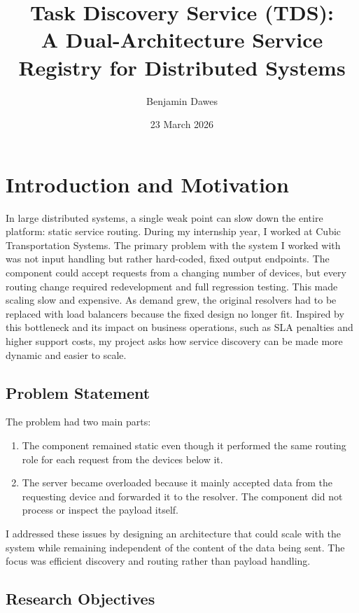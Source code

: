 \documentclass[10pt,a4paper]{article}
\title{\textbf{Task Discovery Service (TDS): \\
A Dual-Architecture Service Registry for Distributed Systems}}
\author{Benjamin Dawes}
\date{23 March 2026}
\begin{document}
\maketitle
\thispagestyle{empty}

\section{Introduction and Motivation}

In large distributed systems, a single weak point can slow down the entire platform: static service routing. During my internship year, I worked at Cubic Transportation Systems. The primary problem with the system I worked with was not input handling but rather hard-coded, fixed output endpoints. The component could accept requests from a changing number of devices, but every routing change required redevelopment and full regression testing. This made scaling slow and expensive. As demand grew, the original resolvers had to be replaced with load balancers because the fixed design no longer fit. Inspired by this bottleneck and its impact on business operations, such as SLA penalties and higher support costs, my project asks how service discovery can be made more dynamic and easier to scale.
\subsection{Problem Statement}

The problem had two main parts:
\begin{enumerate}
    \item The component remained static even though it performed the same routing role for each request from the devices below it.
    \item The server became overloaded because it mainly accepted data from the requesting device and forwarded it to the resolver. The component did not process or inspect the payload itself.
\end{enumerate}

I addressed these issues by designing an architecture that could scale with the system while remaining independent of the content of the data being sent. The focus was efficient discovery and routing rather than payload handling.

\subsection{Research Objectives}
\end{document}
